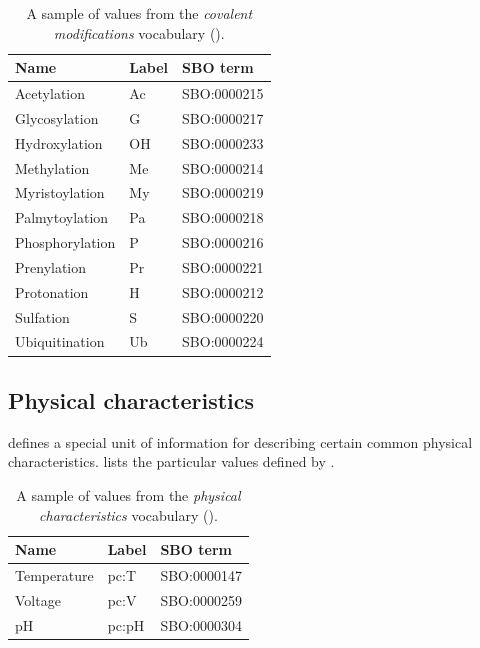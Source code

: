 \begin{table}[htb]
  \centering
  \begin{tabular}{l>{\ttfamily}l>{\ttfamily}l}
    \toprule
    \textbf{Name}   & \textbf{\rmfamily Label} & \textbf{\rmfamily SBO term} \\
    \midrule
    Acetylation     & Ac    & SBO:0000215\\
    Glycosylation   & G     & SBO:0000217\\
    Hydroxylation   & OH    & SBO:0000233\\
    Methylation     & Me    & SBO:0000214\\
    Myristoylation  & My    & SBO:0000219\\
    Palmytoylation  & Pa    & SBO:0000218\\
    Phosphorylation & P     & SBO:0000216\\
    Prenylation     & Pr    & SBO:0000221\\
    Protonation     & H     & SBO:0000212\\
    Sulfation       & S     & SBO:0000220\\
    Ubiquitination  & Ub    & SBO:0000224\\
    \bottomrule
  \end{tabular}
  \caption{A sample of values from the \emph{covalent modifications} vocabulary
    ().}
  \label{tab:techref:covalent-mod-cv}
\end{table}


\subsection{Physical characteristics}
\label{sec:techref:physical-characteristics-cv}

\SBGNPDLone defines a special unit of information for describing
certain common physical characteristics.
 lists the particular values defined
by \SBGNPDLone.


\begin{table}[htb]
  \centering
  \begin{tabular}{l>{\ttfamily}l>{\ttfamily}l}
    \toprule
    \textbf{Name}   & \textbf{\rmfamily Label} & \textbf{\rmfamily SBO term} \\
    \midrule
    Temperature   & pc:T  & SBO:0000147\\
    Voltage       & pc:V  & SBO:0000259\\
    pH            & pc:pH & SBO:0000304\\
    \bottomrule
  \end{tabular}
  \caption{A sample of values from the \emph{physical
      characteristics} vocabulary ().}
  \label{tab:techref:physical-characteristics-cv}
\end{table}

